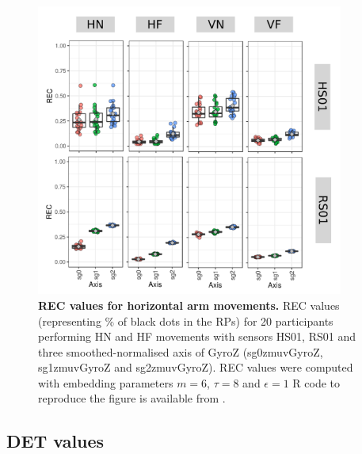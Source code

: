 \begin{figure}
\centering
\includegraphics[width=0.9\textwidth]{rec-bp}
    \caption{
	{\bf REC values for horizontal arm movements.}	
	REC values (representing \% of black dots in the RPs) for 
	20 participants performing HN and HF movements
	with sensors HS01, RS01 and three smoothed-normalised axis 
	of GyroZ (sg0zmuvGyroZ, sg1zmuvGyroZ and sg2zmuvGyroZ).
	REC values were computed with 
	embedding parameters $m=6$, $\tau=8$ and $\epsilon=1$
	R code to reproduce the figure is available from \cite{hwum2018}.
        }
    \label{fig:rec_aH}
\end{figure}






\newpage
\subsection{DET values}

